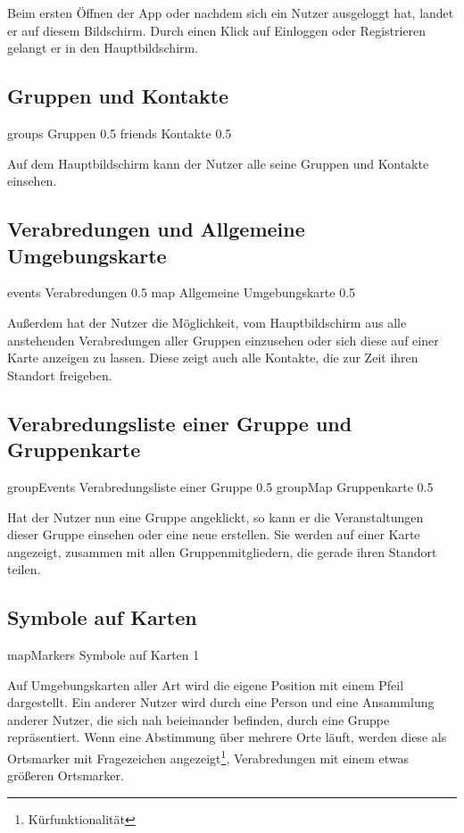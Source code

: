 \documentclass[parskip=full,11pt]{scrartcl}
\begin{document}
Beim ersten Öffnen der App oder nachdem sich ein Nutzer ausgeloggt hat, landet er auf diesem Bildschirm.
Durch einen Klick auf Einloggen oder Registrieren gelangt er in den Hauptbildschirm.

\pagebreak
\subsection{Gruppen und Kontakte}
{groups}
{Gruppen}
{0.5}
{friends}
{Kontakte}
{0.5}

Auf dem Hauptbildschirm kann der Nutzer alle seine Gruppen und Kontakte einsehen.

\pagebreak
\subsection{Verabredungen und Allgemeine Umgebungskarte}
{events}
{Verabredungen}
{0.5}
{map}
{Allgemeine Umgebungskarte}
{0.5}

Außerdem hat der Nutzer die Möglichkeit, vom Hauptbildschirm aus alle anstehenden Verabredungen aller Gruppen einzusehen oder sich diese auf einer Karte anzeigen zu lassen. 
Diese zeigt auch alle Kontakte, die zur Zeit ihren Standort freigeben.

\pagebreak
\subsection{Verabredungsliste einer Gruppe und Gruppenkarte}
{groupEvents}
{Verabredungsliste einer Gruppe}
{0.5}
{groupMap}
{Gruppenkarte}
{0.5}

Hat der Nutzer nun eine Gruppe angeklickt, so kann er die Veranstaltungen dieser Gruppe einsehen oder eine neue erstellen.
Sie werden auf einer Karte angezeigt, zusammen mit allen Gruppenmitgliedern, die gerade ihren Standort teilen.

\pagebreak
\subsection{Symbole auf Karten}
{mapMarkers}
{Symbole auf Karten}
{1}

Auf Umgebungskarten aller Art wird die eigene Position mit einem Pfeil dargestellt. 
Ein anderer Nutzer wird durch eine Person und eine Ansammlung anderer Nutzer, die sich nah beieinander befinden, durch eine Gruppe repräsentiert.
Wenn eine Abstimmung über mehrere Orte läuft, werden diese als Ortsmarker mit Fragezeichen angezeigt\footnote[1]{Kürfunktionalität}, Verabredungen mit einem etwas größeren Ortsmarker.
\end{document}
